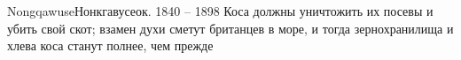 \documentclass{beamer}
\begin{document}
\begin{frame}

\end{frame}



\begin{GalleryFrame}
\end{GalleryFrame}

\begin{Person}{Nongqawuse}{Нонкгавусе}{ок. 1840 -- 1898}
Коса должны уничтожить их посевы и убить свой скот; взамен духи сметут британцев в море, и тогда зернохранилища и хлева коса станут полнее, чем прежде
\end{Person}
\end{document}
